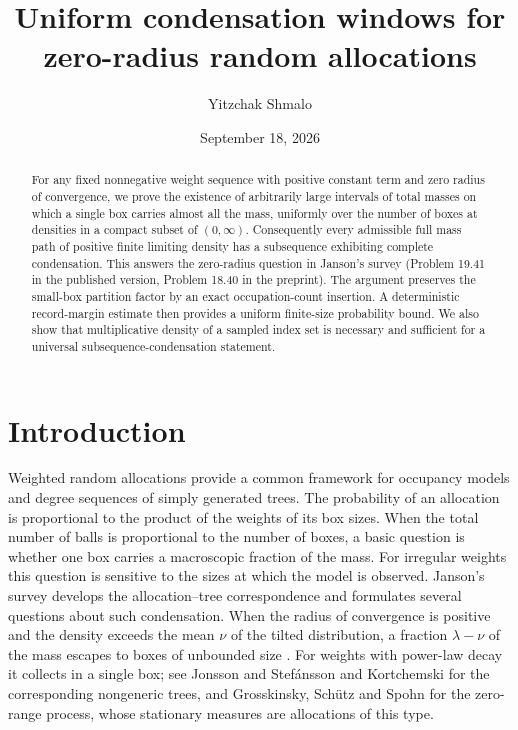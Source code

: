 \documentclass[11pt]{amsart}
\title[Uniform condensation windows]{Uniform condensation windows for zero-radius random allocations}
\author{Yitzchak Shmalo}
\date{September 18, 2026}
\theoremstyle{remark}\newtheorem{remark}[theorem]{Remark}
\begin{document}
\begin{abstract}
For any fixed nonnegative weight sequence with positive constant term and
zero radius of convergence, we prove the existence of arbitrarily large
intervals of total masses on which a single box carries almost all the mass,
uniformly over the number of boxes at densities in a compact subset of
$(0,\infty)$. Consequently every admissible full mass path of positive finite
limiting density has a subsequence exhibiting complete condensation. This
answers the zero-radius question in Janson's survey (Problem 19.41 in the
published version, Problem 18.40 in the preprint).
The argument preserves the small-box partition factor by an exact
occupation-count insertion. A deterministic record-margin estimate then
provides a uniform finite-size probability bound. We also show that
multiplicative density of a sampled index set is necessary and sufficient
for a universal subsequence-condensation statement.
\end{abstract}

\maketitle

\section{Introduction}\label{sec:intro}
Weighted random allocations provide a common framework for occupancy models
\cite{KSC} and degree sequences of simply generated trees. The probability of an
allocation is proportional to the product of the weights of its box sizes.
When the total number of balls is proportional to the number of boxes, a
basic question is whether one box carries a macroscopic fraction of the
mass. For irregular weights this question is sensitive to the sizes at
which the model is observed. Janson's survey \cite{Janson} develops the
allocation--tree correspondence and formulates several questions about
such condensation. When the radius of convergence is positive and the
density exceeds the mean $\nu$ of the tilted distribution, a fraction
$\lambda-\nu$ of the mass escapes to boxes of unbounded size
\cite[Lemma~19.32]{Janson}.
For weights with power-law decay it collects in a single box; see Jonsson
and Stef\'ansson \cite{JS} and Kortchemski \cite{Kortchemski} for the
corresponding nongeneric trees, and Grosskinsky, Sch\"utz and Spohn
\cite{GSS} for the zero-range process, whose stationary measures are
allocations of this type.
\end{document}
